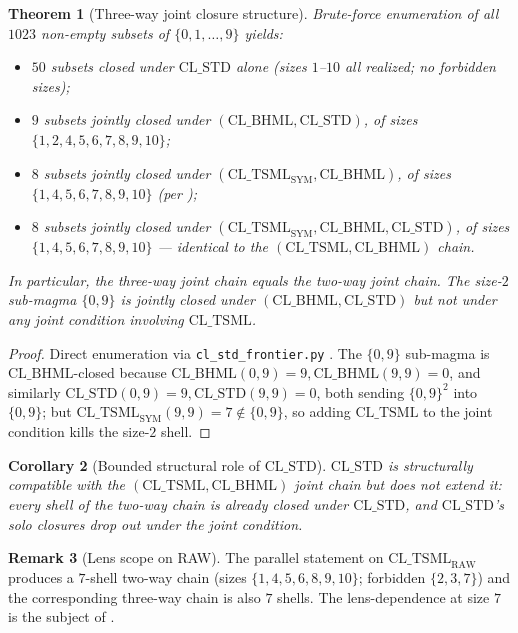 \documentclass[11pt,reqno]{amsart}
\newtheorem{theorem}{Theorem}[section]
\newtheorem{corollary}[theorem]{Corollary}
\theoremstyle{definition}
\newtheorem{remark}[theorem]{Remark}
\newcommand{\TSML}{\mathrm{CL\_TSML}}
\newcommand{\BHML}{\mathrm{CL\_BHML}}
\newcommand{\STDx}{\mathrm{CL\_STD}}
\begin{document}
\begin{theorem}[Three-way joint closure structure]
\label{thm:three-way-closure}
Brute-force enumeration of all $1023$ non-empty subsets of
$\{0, 1, \ldots, 9\}$ yields:
\begin{itemize}[leftmargin=*]
\item $50$ subsets closed under $\STDx$ alone (sizes $1$--$10$ all
  realized; no forbidden sizes);
\item $9$ subsets jointly closed under $(\BHML, \STDx)$, of sizes
  $\{1, 2, 4, 5, 6, 7, 8, 9, 10\}$;
\item $8$ subsets jointly closed under
  $(\TSML_{\mathrm{SYM}}, \BHML)$, of sizes $\{1, 4, 5, 6, 7, 8, 9, 10\}$
  (per \cite{Sanders2026FourCore});
\item $8$ subsets jointly closed under
  $(\TSML_{\mathrm{SYM}}, \BHML, \STDx)$, of sizes
  $\{1, 4, 5, 6, 7, 8, 9, 10\}$ — identical to the $(\TSML, \BHML)$ chain.
\end{itemize}
In particular, the three-way joint chain equals the two-way joint
chain. The size-$2$ sub-magma $\{0, 9\}$ is jointly closed under
$(\BHML, \STDx)$ but not under any joint condition involving $\TSML$.
\end{theorem}

\begin{proof}
Direct enumeration via \texttt{cl\_std\_frontier.py}
\cite{Gen13Foundations}. The $\{0, 9\}$ sub-magma is
$\BHML$-closed because $\BHML(0, 9) = 9, \BHML(9, 9) = 0$, and
similarly $\STDx(0, 9) = 9, \STDx(9, 9) = 0$, both sending $\{0, 9\}^2$
into $\{0, 9\}$; but $\TSML_{\mathrm{SYM}}(9, 9) = 7 \notin \{0, 9\}$,
so adding $\TSML$ to the joint condition kills the size-$2$ shell.
\end{proof}

\begin{corollary}[Bounded structural role of $\STDx$]
\label{cor:std-role}
$\STDx$ is structurally compatible with the $(\TSML, \BHML)$ joint
chain but does not extend it: every shell of the two-way chain is
already closed under $\STDx$, and $\STDx$'s solo closures drop out
under the joint condition.
\end{corollary}

\begin{remark}[Lens scope on RAW]
\label{rem:raw-lens-scope}
The parallel statement on $\TSML_{\mathrm{RAW}}$ produces a
$7$-shell two-way chain (sizes $\{1, 4, 5, 6, 8, 9, 10\}$;
forbidden $\{2, 3, 7\}$) and the corresponding three-way chain is
also $7$ shells. The lens-dependence at size $7$ is the subject of
\cite{Sanders2026LensDependence}.
\end{remark}
\end{document}
